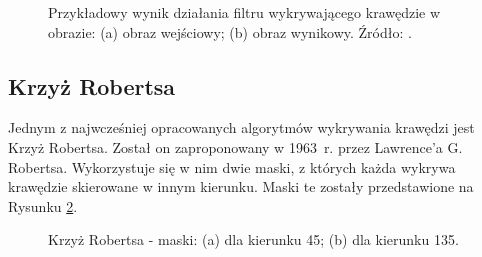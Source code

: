\documentclass[a4paper,twocolumn,12pt]{article}
\begin{document}
\begin{figure}[!ht]
 \begin{center}
 \end{center}
 \caption{
  Przykładowy wynik działania filtru wykrywającego krawędzie w obrazie:
  (a) obraz wejściowy;
  (b) obraz wynikowy.
  Źródło: \cite{roberts}.
 }
 \label{fig:edges_example}
\end{figure}


\subsection{Krzyż Robertsa}

Jednym z najwcześniej opracowanych algorytmów wykrywania krawędzi jest Krzyż Robertsa.
Został on zaproponowany w 1963~r. przez Lawrence’a G. Robertsa.
Wykorzystuje się w nim dwie maski, z których każda wykrywa krawędzie skierowane w innym kierunku.
Maski te zostały przedstawione na Rysunku \ref{fig:roberts_matrices}.

\begin{figure}[!ht]
 \begin{center}
 \end{center}
 \caption{
  Krzyż Robertsa - maski:
  (a) dla kierunku 45\textdegree;
  (b) dla kierunku 135\textdegree.
 }
 \label{fig:roberts_matrices}
\end{figure}
\end{document}
